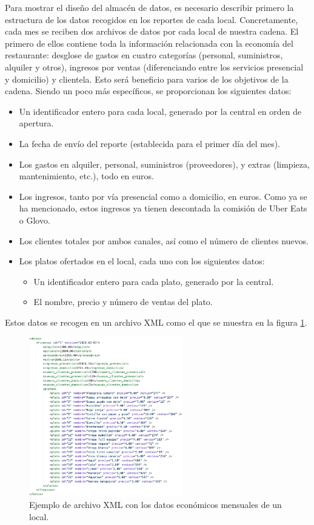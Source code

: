 \documentclass[11pt]{opticajnl}
\begin{document}
Para mostrar el diseño del almacén de datos, es necesario describir primero la estructura de los datos recogidos en los reportes de cada local. Concretamente, cada mes se reciben dos archivos de datos por cada local de nuestra cadena. El primero de ellos contiene toda la información relacionada con la economía del restaurante: desglose de gastos en cuatro categorías (personal, suministros, alquiler y otros), ingresos por ventas (diferenciando entre los servicios presencial y domicilio) y clientela. Esto será beneficio para varios de los objetivos de la cadena. Siendo un poco más específicos, se proporcionan los siguientes datos:
\begin{itemize}
\item Un identificador entero para cada local, generado por la central en orden de apertura.
\item La fecha de envío del reporte (establecida para el primer día del mes). 
\item Los gastos en alquiler, personal, suministros (proveedores), y extras (limpieza, mantenimiento, etc.), todo en euros.
\item Los ingresos, tanto por vía presencial como a domicilio, en euros. Como ya se ha mencionado, estos ingresos ya tienen descontada la comisión de Uber Eats o Glovo.
\item Los clientes totales por ambos canales, así como el número de clientes nuevos.
\item Los platos ofertados en el local, cada uno con los siguientes datos:
\begin{itemize}
\item Un identificador entero para cada plato, generado por la central.
\item El nombre, precio y número de ventas del plato. 
\end{itemize}
\end{itemize}

Estos datos se recogen en un archivo XML como el que se muestra en la figura \ref{fig:xml_economico}.

\begin{figure}[h]
\centering
\includegraphics[width=0.6\textwidth]{fotos/1.png}
\caption{Ejemplo de archivo XML con los datos económicos mensuales de un local.}
\label{fig:xml_economico}
\end{figure}
\end{document}
